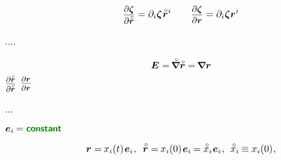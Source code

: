 \begin{equation*}
\scalebox{.9}{$ \displaystyle \frac{\raisemath{-0.2em}{\partial \bm{\zeta}}}{\partial \initiallocationvector} $} = \partial_i \bm{\zeta} \hspace{.1ex} \initiallocationvector^i
\hspace{2em}
\scalebox{.9}{$ \displaystyle \frac{\raisemath{-0.2em}{\partial \bm{\zeta}}}{\partial \currentlocationvector} $} = \partial_i \bm{\zeta} \currentlocationvector^{i}
\end{equation*}


....

\nopagebreak\vspace{-0.2em}\begin{equation*}
\UnitDyad
= \tikzmark{unitTensorAsOriginalDerivativeBegin} \hspace{-0.25ex} \boldnablacircled \initiallocationvector \tikzmark{unitTensorAsOriginalDerivativeEnd}
= \tikzmark{unitTensorAsCurrentDerivativeBegin} \hspace{-0.25ex} \boldnabla \currentlocationvector \tikzmark{unitTensorAsCurrentDerivativeEnd}
\end{equation*}%
%
{${ \scalebox{0.8}{$ \displaystyle \frac{\raisemath{-0.2em}{\partial \initiallocationvector}}{\partial \initiallocationvector} $} }$}%
%
{${ \scalebox{0.8}{$ \displaystyle \frac{\raisemath{-0.2em}{\partial \currentlocationvector}}{\partial \currentlocationvector} $} }$}

...

  ${\bm{e}_i \hspace{-0.16ex} = \boldconstant}$

\nopagebreak\vspace{-0.2em}\begin{equation*}
\currentlocationvector = \hspace{-0.15ex} x_{i}(t) \hspace{.2ex} \bm{e}_i
\hspace{.1ex} , \:\;
\initiallocationvector = \hspace{-0.15ex} x_{i}(0) \hspace{.2ex} \bm{e}_i \hspace{-0.16ex} = \mathcircabove{x}_i \hspace{.1ex} \bm{e}_i
\hspace{.1ex} , \:\:
\mathcircabove{x}_i \hspace{-0.15ex} \equiv x_{i}(0)
\hspace{.1ex} ,
\end{equation*}

